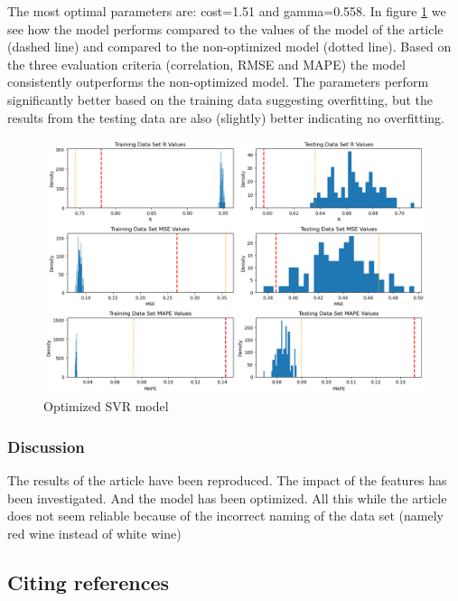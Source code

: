 \documentclass{article}
\begin{document}
The most optimal parameters are: cost=1.51 and gamma=0.558.
In figure \ref{fig:optimized-SVR-model} we see how the model performs compared to the values of the model of the article \cite{dahal2021prediction} (dashed line) and compared to the non-optimized model (dotted line). 
Based on the three evaluation criteria (correlation, RMSE and MAPE) the model consistently outperforms the non-optimized model. The parameters perform significantly better based on the training data suggesting overfitting, but the results from the testing data are also (slightly) better indicating no overfitting.
\begin{figure}
	\centering
	\includegraphics[width=\linewidth]{figures/SVR_optimized_model.png}
	\caption{Optimized SVR model}
	\label{fig:optimized-SVR-model}
\end{figure}




\subsubsection{Discussion}


The results of the article have been reproduced. The impact of the features has been investigated. And the model has been optimized. All this while the article does not seem reliable because of the incorrect naming of the data set (namely red wine instead of white wine)


\subsection{Citing references}
\end{document}

